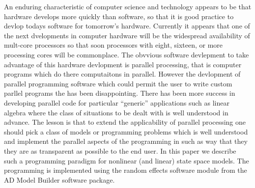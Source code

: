 
\def\wha{\widehat\alpha}
\def\wht{\widehat\theta}
\def\Nipjp{N_{i+1,j+1}}
\def\Nipm{N_{i+1,m}}
\def\Nij{N_{ij}}
\def\nij{n_{ij}}
\def\Ei{E_i}
\def\Nio{N_{i1}}
\def\Nim{N_{im}}
\def\Nnpj{N_{n+1,j}}
\def\nnpj{n_{n+1,j}}
\def\Nimm{N_{i,m-1}}
\def\Zij{Z_{ij}}
\def\Fij{F_{ij}}
\def\Zim{Z_{im}}
\def\Zimm{Z_{i,m-1}}
\def\qip{q_{i+1}}
\def\qi{q_i}
\def\ui{u_i}
\def\sj{s_j}
\def\deltai{\delta_i}
\def\di{d_i}
\def\epsij{\epsilon_{ij}}
\def\kappaij{\kappa_{ij}}
\def\epst{\epsilon_t}
\def\at{\alpha_t}
\def\atp{\alpha_{t+1}}
\def\gami{\gam_i}
\def\lami{\lambda_i}
\def\etai{\eta_i}
\def\Cijobs{C^{obs}_{ij}}
\def\Cij{C_{ij}}
\def\myeq{}

An enduring characteristic of computer science and technology
appears to be that hardware develops more quickly than software,
so that it is good practice to devlop todays software for tomorrow's
hardware. Currently it appears that one of the next dvelopments 
in computer hardware will be the widespread availability of mult-core processors so that soon
processors with eight, sixteen, or more processing cores will be commonplace.
The obvvious software devlepment to take advantage of this hardware devlopment 
is parallel processing, that is computer programs which do there computaitons in parallel. However the devlopment of parallel programming software 
which could permit the user to write custom parllel programs the has been 
disappointing. There has been more success in developing parallel code for
particular ``generic'' applications such as linear algebra 
where the class of situations to be dealt  with is well understood in advance.
The lesson is that to extend the applicability of parallel processing 
one should pick a class of models or programming problems which is 
well understood and implement the parallel aspects of the programming in such as
way that they they are as transparent as possible to the end user.
In this paper we describe such a programming paradigm for 
nonlinear (and linear) state space models. The programming is 
implemented using the random effects software module from
the AD Model Builder software package.

